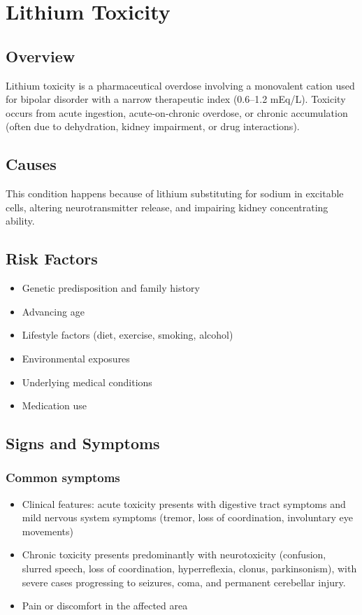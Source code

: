 \chapter{Lithium Toxicity}
\label{sec:Lithium Toxicity}

\section{Overview}
Lithium toxicity is a pharmaceutical overdose involving a monovalent cation used for bipolar disorder with a narrow therapeutic index (0.6--1.2 mEq/L). Toxicity occurs from acute ingestion, acute-on-chronic overdose, or chronic accumulation (often due to dehydration, kidney impairment, or drug interactions).
\section{Causes}
This condition happens because of lithium substituting for sodium in excitable cells, altering neurotransmitter release, and impairing kidney concentrating ability.     
\section{Risk Factors}

\begin{itemize}[noitemsep]
  \item Genetic predisposition and family history
  \item Advancing age
  \item Lifestyle factors (diet, exercise, smoking, alcohol)
  \item Environmental exposures
  \item Underlying medical conditions
  \item Medication use
\end{itemize}
\section{Signs and Symptoms}

\subsection{Common symptoms}
\begin{itemize}[noitemsep]
  \item Clinical features: acute toxicity presents with digestive tract symptoms and mild nervous system symptoms (tremor, loss of coordination, involuntary eye movements)
  \item Chronic toxicity presents predominantly with neurotoxicity (confusion, slurred speech, loss of coordination, hyperreflexia, clonus, parkinsonism), with severe cases progressing to seizures, coma, and permanent cerebellar injury.
  \item Pain or discomfort in the affected area
  \end{itemize}

